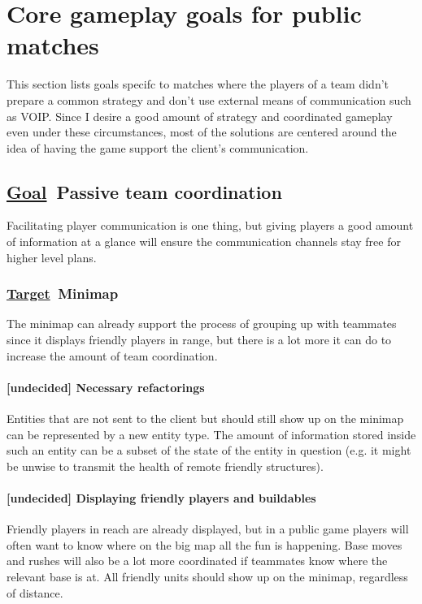 \documentclass{scrartcl}
\newcommand{\goal}     [0]{\textbf{\underline{Goal}\ }}
\newcommand{\target}   [0]{\textbf{\underline{Target}\ }}
\newcommand{\undecided}[0]{\textcolor{undecided}{\textbf{[undecided] }}}
\begin{document}
\section{Core gameplay goals for public matches}

This section lists goals specifc to matches where the players of a team didn't prepare a common strategy and don't use external means of communication such as VOIP. Since I desire a good amount of strategy and coordinated gameplay even under these circumstances, most of the solutions are centered around the idea of having the game support the client's communication.

\subsection{\goal Passive team coordination}

Facilitating player communication is one thing, but giving players a good amount of information at a glance will ensure the communication channels stay free for higher level plans.

\subsubsection{\target Minimap}

The minimap can already support the process of grouping up with teammates since it displays friendly players in range, but there is a lot more it can do to increase the amount of team coordination.

\paragraph{\undecided Necessary refactorings}

Entities that are not sent to the client but should still show up on the minimap can be represented by a new entity type. The amount of information stored inside such an entity can be a subset of the state of the entity in question (e.g. it might be unwise to transmit the health of remote friendly structures).

\paragraph{\undecided Displaying friendly players and buildables}

Friendly players in reach are already displayed, but in a public game players will often want to know where on the big map all the fun is happening. Base moves and rushes will also be a lot more coordinated if teammates know where the relevant base is at. All friendly units should show up on the minimap, regardless of distance.
\end{document}
